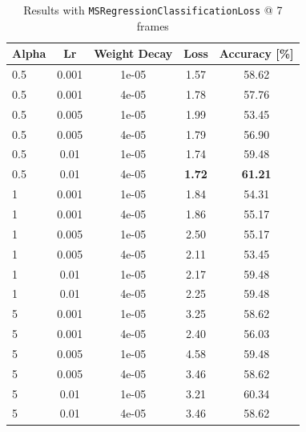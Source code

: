 \documentclass[10pt,twocolumn,letterpaper]{article}
\begin{document}
\begin{table}[h!]
	\begin{center}
		\begin{tabular}{lcc|cc}
			\textbf{Alpha} & \textbf{Lr} & \textbf{Weight Decay} & \textbf{Loss} & \textbf{Accuracy [\%]}\\
			\hline
			0.5&0.001&1e-05&1.57&58.62\\
			0.5&0.001&4e-05&1.78&57.76\\
			0.5&0.005&1e-05&1.99&53.45\\
			0.5&0.005&4e-05&1.79&56.90\\
			0.5&0.01&1e-05&1.74&59.48\\
			0.5&0.01&4e-05&\textbf{1.72}&\textbf{61.21}\\
			1&0.001&1e-05&1.84&54.31\\
			1&0.001&4e-05&1.86&55.17\\
			1&0.005&1e-05&2.50&55.17\\
			1&0.005&4e-05&2.11&53.45\\
			1&0.01&1e-05&2.17&59.48\\
			1&0.01&4e-05&2.25&59.48\\
			5&0.001&1e-05&3.25&58.62\\
			5&0.001&4e-05&2.40&56.03\\
			5&0.005&1e-05&4.58&59.48\\
			5&0.005&4e-05&3.46&58.62\\
			5&0.01&1e-05&3.21&60.34\\
			5&0.01&4e-05&3.46&58.62\\
			\hline
		\end{tabular}
	\end{center}	
	\caption{Results with \texttt{MSRegressionClassificationLoss} @ 7 frames}
\end{table}
\end{document}
